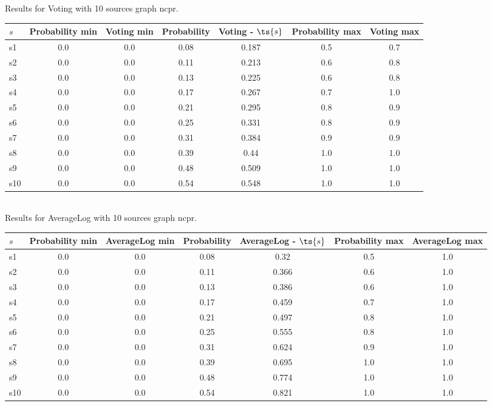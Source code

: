 \documentclass{article}
\begin{document}
\noindent Results for Voting with 10 sources graph ncpr.

\noindent\begin{tabular}{|l|c|c|c|c|c|c|}
\hline
$s$& Probability min & Voting min & Probability & Voting - $\ts{s}$ & Probability max & Voting max\\
\hline
s1 &0.0 & 0.0 & 0.08 & 0.187 & 0.5 & 0.7\\
\hline
s2 &0.0 & 0.0 & 0.11 & 0.213 & 0.6 & 0.8\\
\hline
s3 &0.0 & 0.0 & 0.13 & 0.225 & 0.6 & 0.8\\
\hline
s4 &0.0 & 0.0 & 0.17 & 0.267 & 0.7 & 1.0\\
\hline
s5 &0.0 & 0.0 & 0.21 & 0.295 & 0.8 & 0.9\\
\hline
s6 &0.0 & 0.0 & 0.25 & 0.331 & 0.8 & 0.9\\
\hline
s7 &0.0 & 0.0 & 0.31 & 0.384 & 0.9 & 0.9\\
\hline
s8 &0.0 & 0.0 & 0.39 & 0.44 & 1.0 & 1.0\\
\hline
s9 &0.0 & 0.0 & 0.48 & 0.509 & 1.0 & 1.0\\
\hline
s10 &0.0 & 0.0 & 0.54 & 0.548 & 1.0 & 1.0\\
\hline
\end{tabular}\\

\noindent Results for AverageLog with 10 sources graph ncpr.

\noindent\begin{tabular}{|l|c|c|c|c|c|c|}
\hline
$s$& Probability min & AverageLog min & Probability & AverageLog - $\ts{s}$ & Probability max & AverageLog max\\
\hline
s1 &0.0 & 0.0 & 0.08 & 0.32 & 0.5 & 1.0\\
\hline
s2 &0.0 & 0.0 & 0.11 & 0.366 & 0.6 & 1.0\\
\hline
s3 &0.0 & 0.0 & 0.13 & 0.386 & 0.6 & 1.0\\
\hline
s4 &0.0 & 0.0 & 0.17 & 0.459 & 0.7 & 1.0\\
\hline
s5 &0.0 & 0.0 & 0.21 & 0.497 & 0.8 & 1.0\\
\hline
s6 &0.0 & 0.0 & 0.25 & 0.555 & 0.8 & 1.0\\
\hline
s7 &0.0 & 0.0 & 0.31 & 0.624 & 0.9 & 1.0\\
\hline
s8 &0.0 & 0.0 & 0.39 & 0.695 & 1.0 & 1.0\\
\hline
s9 &0.0 & 0.0 & 0.48 & 0.774 & 1.0 & 1.0\\
\hline
s10 &0.0 & 0.0 & 0.54 & 0.821 & 1.0 & 1.0\\
\hline
\end{tabular}\\
\end{document}
